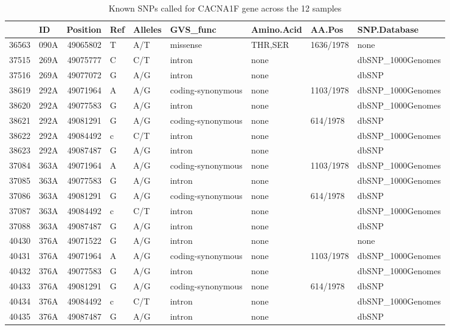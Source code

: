 \documentclass{article}
\begin{document}
\begin{table}[tbp]
\centering
\caption{Known SNPs called for CACNA1F gene across the 12 samples} 
\label{tab:SNPa1F}
{\small
\begin{tabular}{rlrllllll}
  \hline
 & ID & Position & Ref & Alleles & GVS\_func & Amino.Acid & AA.Pos & SNP.Database \\ 
  \hline
36563 & 090A & 49065802 & T & A/T & missense & THR,SER & 1636/1978 & none \\ 
  37515 & 269A & 49075777 & C & C/T & intron & none &  & dbSNP\_1000Genomes \\ 
  37516 & 269A & 49077072 & G & A/G & intron & none &  & dbSNP \\ 
  38619 & 292A & 49071964 & A & A/G & coding-synonymous & none & 1103/1978 & dbSNP\_1000Genomes \\ 
  38620 & 292A & 49077583 & G & A/G & intron & none &  & dbSNP\_1000Genomes \\ 
  38621 & 292A & 49081291 & G & A/G & coding-synonymous & none & 614/1978 & dbSNP \\ 
  38622 & 292A & 49084492 & c & C/T & intron & none &  & dbSNP\_1000Genomes \\ 
  38623 & 292A & 49087487 & G & A/G & intron & none &  & dbSNP \\ 
  37084 & 363A & 49071964 & A & A/G & coding-synonymous & none & 1103/1978 & dbSNP\_1000Genomes \\ 
  37085 & 363A & 49077583 & G & A/G & intron & none &  & dbSNP\_1000Genomes \\ 
  37086 & 363A & 49081291 & G & A/G & coding-synonymous & none & 614/1978 & dbSNP \\ 
  37087 & 363A & 49084492 & c & C/T & intron & none &  & dbSNP\_1000Genomes \\ 
  37088 & 363A & 49087487 & G & A/G & intron & none &  & dbSNP \\ 
  40430 & 376A & 49071522 & G & A/G & intron & none &  & none \\ 
  40431 & 376A & 49071964 & A & A/G & coding-synonymous & none & 1103/1978 & dbSNP\_1000Genomes \\ 
  40432 & 376A & 49077583 & G & A/G & intron & none &  & dbSNP\_1000Genomes \\ 
  40433 & 376A & 49081291 & G & A/G & coding-synonymous & none & 614/1978 & dbSNP \\ 
  40434 & 376A & 49084492 & c & C/T & intron & none &  & dbSNP\_1000Genomes \\ 
  40435 & 376A & 49087487 & G & A/G & intron & none &  & dbSNP \\ 

\end{tabular}}
\end{table}
\end{document}
